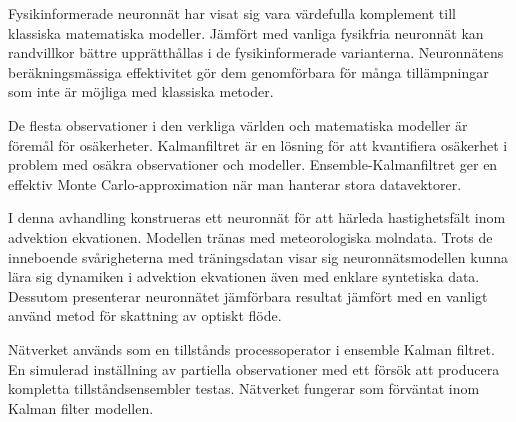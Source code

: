 \documentclass[UKenglish, 12pt, a4paper, sci, utf8, a-1b, online]{aaltothesis}
\numberwithin{equation}{section}
\numberwithin{figure}{section}
\numberwithin{theorem}{section}
\numberwithin{definition}{section}
\numberwithin{lemma}{section}
\begin{document}
%
\begin{abstractpage}[swedish]
Fysikinformerade neuronnät har visat sig vara värdefulla komplement till klassiska matematiska modeller.
Jämfört med vanliga fysikfria neuronnät kan randvillkor bättre upprätth\aa{}llas i de fysikinformerade varianterna.
Neuronnätens beräkningsmässiga effektivitet gör dem genomförbara för m\aa{}nga tillämpningar som inte är möjliga med klassiska metoder.

De flesta observationer i den verkliga världen och matematiska modeller är förem\aa{}l för osäkerheter.
Kalmanfiltret är en lösning för att kvantifiera osäkerhet i problem med osäkra observationer och modeller.
Ensemble-Kalmanfiltret ger en effektiv Monte Carlo-approximation när man hanterar stora datavektorer.

I denna avhandling konstrueras ett neuronnät för att härleda hastighetsfält inom advektion ekvationen.
Modellen tränas med meteorologiska molndata. Trots de inneboende sv\aa{}righeterna med träningsdatan visar sig neuronnätsmodellen kunna lära sig dynamiken i advektion ekvationen även med enklare syntetiska data.
Dessutom presenterar neuronnätet jämförbara resultat jämfört med en vanligt använd metod för skattning av optiskt flöde.

Nätverket används som en tillst\aa{}nds processoperator i ensemble Kalman filtret.
En simulerad inställning av partiella observationer med ett försök att producera kompletta tillst\aa{}ndsensembler testas.
Nätverket fungerar som förväntat inom Kalman filter modellen.
\end{abstractpage}

\newpage


\thesistableofcontents


\cleardoublepage

\end{document}
